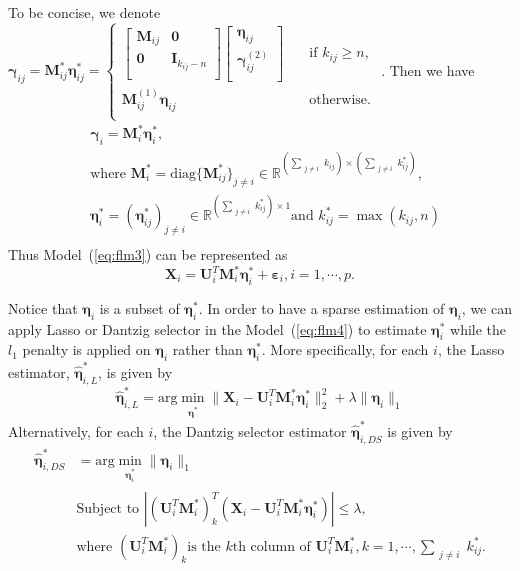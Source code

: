 \documentclass[11pt]{article}
\newcommand{\R}{\mathbb R}
\newcommand{\bX}{\mathbf X}
\newcommand{\bM}{\mathbf M}
\newcommand{\bI}{\mathbf I}
\newcommand{\bU}{\mathbf U}
\newcommand{\bseta}{\boldsymbol{\eta}}
\newcommand{\bvarepsilon}{\boldsymbol{\varepsilon}}
\newcommand{\bgamma}{\boldsymbol{\gamma}}
\begin{document}
To be concise, we denote $\bgamma_{ij} = \bM_{ij}^* \bseta_{ij}^* = \begin{cases}
\begin{bmatrix}
\bM_{ij}  & \mathbf{0} \\
\mathbf{0} & \bI_{k_{ij} - n} \\
\end{bmatrix} \begin{bmatrix}
\bseta_{ij} \\
\bgamma_{ij}^{(2)} \\
\end{bmatrix}      & \quad \text{if } k_{ij} \geq n, \\
\bM_{ij}^{(1)}\bseta_{ij}  & \quad \text{otherwise. }\\
\end{cases}$. Then we have 
\begin{equation}
	\begin{aligned}
	&\bgamma_i = \bM_i^* \bseta_i^*, \\
	&\text{where } \bM_i^* = \text{diag} \{\bM_{ij}^*\}_{j \neq i} \in \R^{(\sum_{\substack{j \neq i}} k_{ij}) \times (\sum_{\substack{j \neq i}} k_{ij}^*)},\\ 
	&\bseta_i^* = (\bseta_{ij}^*)_{j \neq i} \in \R^{(\sum_{\substack{j \neq i}} k_{ij}^*) \times 1} \text{and } k_{ij}^* = \max (k_{ij}, n)\\
	\end{aligned}
\end{equation}    
Thus Model~(\ref{eq:flm3}) can be represented as
\begin{equation}
    \label{eq:flm4}
	\bX_i = \bU_i^T \bM_{i}^* \bseta_i^* + \bvarepsilon_i, i = 1, \cdots, p.
\end{equation}

Notice that $\bseta_i$ is a subset of $\bseta_i^*$. In order to have a sparse estimation of $\bseta_i$, we can apply Lasso or Dantzig selector in the Model~(\ref{eq:flm4}) to estimate $\bseta_i^*$ while the $l_1$ penalty is applied on $\bseta_i$ rather than $\bseta_i^*$. More specifically, for each $i$, the Lasso estimator, $\hat{\bseta}_{i,L}^*$, is given by
\begin{equation}
	\hat{\bseta}_{i,L}^* = \text{arg} \min_{\substack{\bseta^*}} \|\bX_i - \bU_i^T\bM_{i}^*\bseta_i^*\|_2^2 + \lambda \|\bseta_i\|_1
\end{equation}
Alternatively, for each $i$, the Dantzig selector estimator $\hat{\bseta}_{i,DS}^*$ is given by
\begin{equation}
    \begin{aligned}
    \hat{\bseta}_{i,DS}^* &= \text{arg} \min_{\substack{\bseta_i^*}} \|\bseta_i\|_1 \\
    &\text{Subject to } |(\bU_i^T\bM_{i}^*)_k^T(\bX_i - \bU_i^T\bM_{i}^*\bseta_i^*)| \leq \lambda,\\
    &\text{where } (\bU_i^T\bM_{i}^*)_k \text{is the }k \text{th column of }\bU_i^T\bM_{i}^*, k = 1, \cdots, \sum_{\substack{j \neq i}}k_{ij}^*.
    \end{aligned}
\end{equation} 



\end{document}
